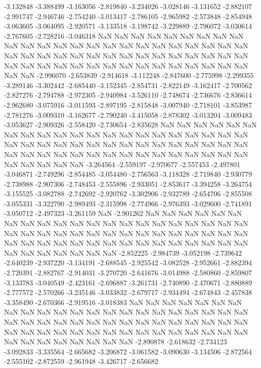-3.132848
-3.388499
-3.163056
-2.819840
-3.234026
-3.028146
-3.131652
-2.882107
-2.991747
-2.946746
-2.754240
-3.013417
-2.786105
-2.965982
-2.573848
-2.854948
-3.063605
-3.064095
-2.920571
-3.133518
-3.198742
-3.229889
-2.796072
-3.030614
-2.767605
-2.728216
-3.046318
NaN
NaN
NaN
NaN
NaN
NaN
NaN
NaN
NaN
NaN
NaN
NaN
NaN
NaN
NaN
NaN
NaN
NaN
NaN
NaN
NaN
NaN
NaN
NaN
NaN
NaN
NaN
NaN
NaN
NaN
NaN
NaN
NaN
NaN
NaN
NaN
NaN
NaN
NaN
NaN
NaN
NaN
NaN
NaN
NaN
NaN
NaN
NaN
NaN
NaN
NaN
NaN
NaN
NaN
NaN
NaN
-2.996070
-2.653839
-2.914618
-3.112248
-2.847600
-2.775998
-2.299355
-3.289146
-3.302442
-2.685440
-3.152345
-2.854731
-2.822149
-3.162417
-2.700562
-2.827276
-2.794788
-2.972305
-2.940984
-3.526110
-2.748674
-2.736676
-2.836614
-2.962680
-3.075916
-3.011593
-2.897195
-2.815848
-3.007940
-2.718101
-3.853987
-2.781276
-3.009310
-3.162677
-2.790240
-3.415058
-2.878302
-3.013204
-3.009483
-3.053627
-2.909326
-2.558420
-2.730654
-2.835628
NaN
NaN
NaN
NaN
NaN
NaN
NaN
NaN
NaN
NaN
NaN
NaN
NaN
NaN
NaN
NaN
NaN
NaN
NaN
NaN
NaN
NaN
NaN
NaN
NaN
NaN
NaN
NaN
NaN
NaN
NaN
NaN
NaN
NaN
NaN
NaN
NaN
NaN
NaN
NaN
NaN
NaN
NaN
NaN
NaN
NaN
NaN
NaN
NaN
NaN
NaN
NaN
NaN
NaN
NaN
NaN
-3.264564
-2.559197
-2.970677
-2.557453
-2.497801
-3.046871
-2.749296
-2.854485
-3.054480
-2.756563
-3.118328
-2.719840
-2.930779
-2.738988
-2.907306
-2.748453
-2.555896
-2.933051
-2.853617
-3.394258
-3.264754
-3.155525
-3.082788
-2.742692
-2.920762
-3.302906
-2.932789
-2.654706
-2.855508
-3.055331
-3.322790
-2.989493
-2.315998
-2.774966
-2.976393
-3.029600
-2.741891
-3.050712
-2.497323
-3.261159
NaN
-2.901262
NaN
NaN
NaN
NaN
NaN
NaN
NaN
NaN
NaN
NaN
NaN
NaN
NaN
NaN
NaN
NaN
NaN
NaN
NaN
NaN
NaN
NaN
NaN
NaN
NaN
NaN
NaN
NaN
NaN
NaN
NaN
NaN
NaN
NaN
NaN
NaN
NaN
NaN
NaN
NaN
NaN
NaN
NaN
NaN
NaN
NaN
NaN
NaN
NaN
NaN
NaN
NaN
NaN
NaN
NaN
NaN
NaN
NaN
-2.852225
-2.984739
-3.052198
-2.739642
-2.640239
-2.937220
-3.134191
-2.688545
-2.925542
-3.082528
-2.952661
-2.882394
-2.720391
-2.882767
-2.914031
-3.270720
-2.641676
-3.014988
-2.580860
-2.859807
-3.133783
-3.040549
-2.423161
-2.696887
-3.261731
-2.740890
-2.470671
-2.880889
-2.777572
-2.570266
-3.235146
-3.033832
-2.679717
-2.934494
-2.674843
-2.457838
-3.358490
-2.670366
-2.919516
-3.018383
NaN
NaN
NaN
NaN
NaN
NaN
NaN
NaN
NaN
NaN
NaN
NaN
NaN
NaN
NaN
NaN
NaN
NaN
NaN
NaN
NaN
NaN
NaN
NaN
NaN
NaN
NaN
NaN
NaN
NaN
NaN
NaN
NaN
NaN
NaN
NaN
NaN
NaN
NaN
NaN
NaN
NaN
NaN
NaN
NaN
NaN
NaN
NaN
NaN
NaN
NaN
NaN
NaN
NaN
NaN
NaN
NaN
NaN
NaN
NaN
-2.890878
-2.618632
-2.734123
-3.092833
-3.335564
-2.665682
-3.206872
-3.061582
-3.090630
-3.134506
-2.872564
-2.555102
-2.872559
-2.961948
-3.426717
-2.656682
